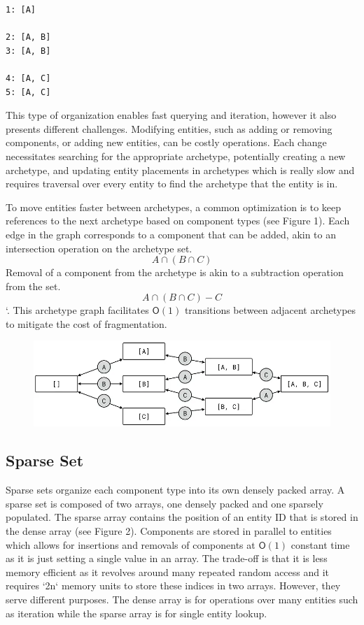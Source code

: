 \documentclass[openany, amssymb, psamsfonts]{amsart}
\theoremstyle{definition}
\numberwithin{equation}{section}
\begin{document}
\begin{verbatim}
1: [A]

2: [A, B]
3: [A, B]

4: [A, C]
5: [A, C]
\end{verbatim}
This type of organization enables fast querying and iteration, however it also presents different challenges. Modifying entities, such as adding or removing components, or adding new entities, can be costly operations. Each change necessitates searching for the appropriate archetype, potentially creating a new archetype, and updating entity placements in archetypes which is really slow and requires traversal over every entity to find the archetype that the entity is in.


To move entities faster between archetypes, a common optimization is to keep 
references to the next archetype based on component types (see Figure 1). 
Each edge in the graph corresponds to a component that can be added, akin to an 
intersection operation on the archetype set. \[A \cap \left( B \cap C \right)\] 
Removal of a component from the archetype is akin to a subtraction operation from the set. \[A \cap \left( B \cap C \right) - {C}\]`. 
This archetype graph facilitates $\mathsf{O}(1)$ transitions between adjacent archetypes to mitigate the cost of fragmentation.

\begin{figure}[htbp]
\centering
\includegraphics[scale=0.4]{../../images/archetype_graph.png}\label{Fig 1: Archetype Graph}
\end{figure}

\subsection{Sparse Set}
Sparse sets organize each component type into its own densely packed array. A sparse set is composed of two arrays, one densely packed and one sparsely populated. The sparse array contains the position of an entity ID that is stored in the dense array (see Figure 2). Components are stored in parallel to entities which allows for insertions and removals of components at $\mathsf{O}(1)$  constant time as it is just setting a single value in an array. The trade-off is that it is less memory efficient as it revolves around many repeated random access and it requires `2n` memory units to store these indices in two arrays. However, they serve different purposes. The dense array is for operations over many entities such as iteration while the sparse array is for single entity lookup. 
\end{document}
